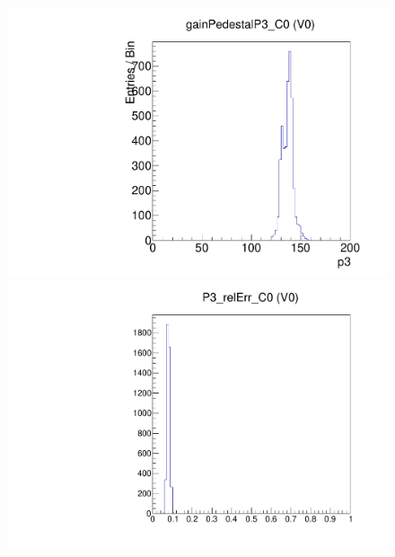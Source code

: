 \begin{figure}[!Hp]
\centering
\begin{minipage}{0.45\textwidth}
  \includegraphics[width=1.0\textwidth]{figures/gainped_gainPedestalP3.pdf}
  \caption{}
  \label{fig:gainped_gainPedestalP3}
\end{minipage}
\hspace{0.3cm}
\begin{minipage}{0.45\textwidth}
  \includegraphics[width=1.0\textwidth]{figures/gainped_P3_relErr.pdf}
  \caption{}
  \label{fig:gainped_P3_relErr}
\end{minipage}
\end{figure}

